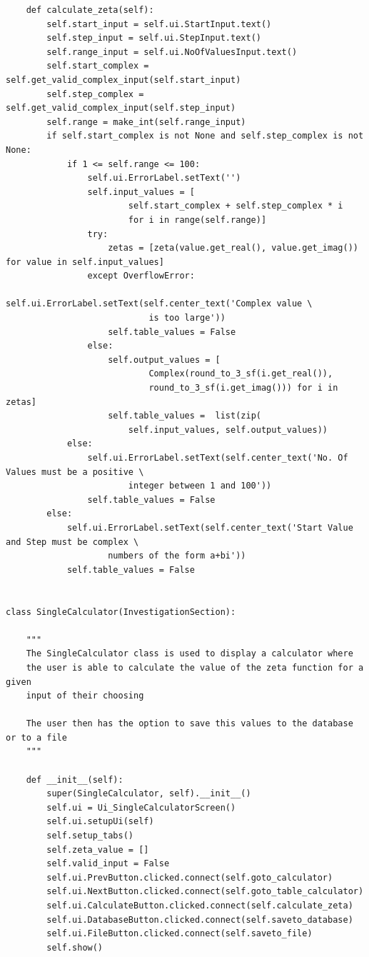 \documentclass{article}
\begin{document}
\begin{lstlisting}
    def calculate_zeta(self):
        self.start_input = self.ui.StartInput.text()
        self.step_input = self.ui.StepInput.text()
        self.range_input = self.ui.NoOfValuesInput.text()
        self.start_complex = self.get_valid_complex_input(self.start_input)
        self.step_complex = self.get_valid_complex_input(self.step_input)
        self.range = make_int(self.range_input)
        if self.start_complex is not None and self.step_complex is not None:
            if 1 <= self.range <= 100:
                self.ui.ErrorLabel.setText('')
                self.input_values = [
                        self.start_complex + self.step_complex * i
                        for i in range(self.range)]
                try:
                    zetas = [zeta(value.get_real(), value.get_imag()) for value in self.input_values]
                except OverflowError:
                    self.ui.ErrorLabel.setText(self.center_text('Complex value \
                            is too large'))
                    self.table_values = False
                else:
                    self.output_values = [
                            Complex(round_to_3_sf(i.get_real()),
                            round_to_3_sf(i.get_imag())) for i in zetas]
                    self.table_values =  list(zip(
                        self.input_values, self.output_values))
            else:
                self.ui.ErrorLabel.setText(self.center_text('No. Of Values must be a positive \
                        integer between 1 and 100'))
                self.table_values = False
        else:
            self.ui.ErrorLabel.setText(self.center_text('Start Value and Step must be complex \
                    numbers of the form a+bi'))
            self.table_values = False


class SingleCalculator(InvestigationSection):

    """
    The SingleCalculator class is used to display a calculator where
    the user is able to calculate the value of the zeta function for a given
    input of their choosing

    The user then has the option to save this values to the database or to a file
    """

    def __init__(self):
        super(SingleCalculator, self).__init__()
        self.ui = Ui_SingleCalculatorScreen()
        self.ui.setupUi(self)
        self.setup_tabs()
        self.zeta_value = []
        self.valid_input = False
        self.ui.PrevButton.clicked.connect(self.goto_calculator)
        self.ui.NextButton.clicked.connect(self.goto_table_calculator)
        self.ui.CalculateButton.clicked.connect(self.calculate_zeta)
        self.ui.DatabaseButton.clicked.connect(self.saveto_database)
        self.ui.FileButton.clicked.connect(self.saveto_file)
        self.show()


\end{lstlisting}
\end{document}

